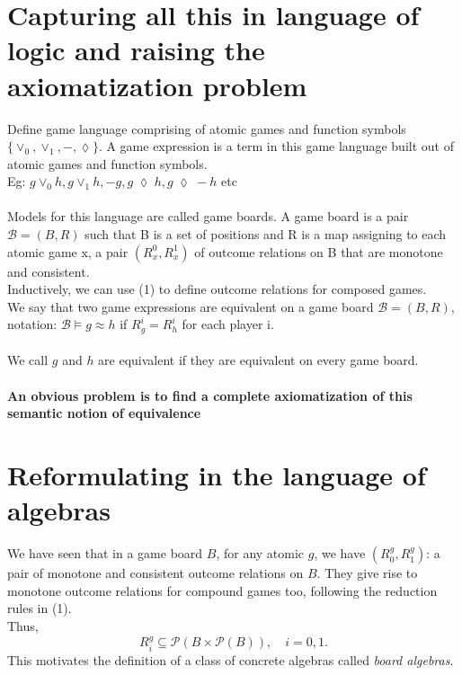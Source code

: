 \documentclass[12pt]{article}
\begin{document}
\section{Capturing all this in language of logic and raising the axiomatization problem}
Define game language comprising of atomic games and function symbols $\{\vee_{0},\vee_{1},-,\lozenge\}$. A game expression is a term in this game language built out of atomic games and function symbols. \\
Eg: $g \vee_{0}h, g \vee_{1} h, -g, g \; \lozenge \; h, g \; \lozenge \; -h$ etc \\ \\
Models for this language are called game boards. A game board is a pair $\mathcal{B}=(B,R)$ such that B is a set of positions and R is a map assigning to each atomic game x, a pair $(R^{0}_{x}, R^{1}_{x})$ of outcome relations on B that are monotone and consistent. \\
Inductively, we can use (1) to define outcome relations for composed games. \\
We say that two game expressions are equivalent on a game board $\mathcal{B}=(B,R)$, notation: $\mathcal{B} \vDash g \approx h$ if $R^{i}_{g}=R^{i}_{h}$ for each player i. \\ \\
We call $g$ and $h$ are equivalent if they are equivalent on every game board. \\ \\
\textbf{An obvious problem is to find a complete axiomatization of this semantic notion of equivalence}
\section{Reformulating in the language of algebras}
We have seen that in a game board $B$, for any atomic $g$, we have 
$(R^g_0, R^g_1)$: a pair of monotone and consistent outcome relations on $B$. 
They give rise to monotone outcome relations for compound games too, 
following the reduction rules in (1).\\
Thus,
\[
R^g_i \subseteq \mathcal{P}(B \times \mathcal{P}(B)), \quad i = 0,1.
\]
This motivates the definition of a class of concrete algebras 
called \emph{board algebras}.
\end{document}
